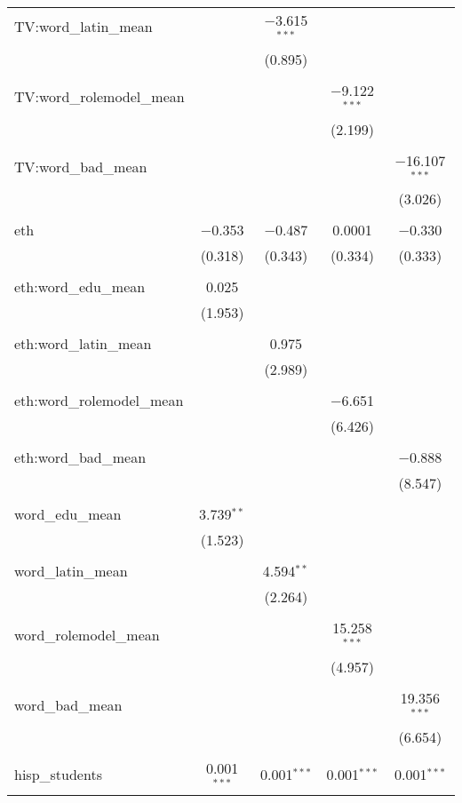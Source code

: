 \begin{table}[!htbp]
\begin{tabular}{@{\extracolsep{-2pt}}lcccc}
 TV:word\_latin\_mean &  & $-$3.615$^{***}$ &  &  \\ 
  &  & (0.895) &  &  \\ 
  & & & & \\ 
 TV:word\_rolemodel\_mean &  &  & $-$9.122$^{***}$ &  \\ 
  &  &  & (2.199) &  \\ 
  & & & & \\ 
 TV:word\_bad\_mean &  &  &  & $-$16.107$^{***}$ \\ 
  &  &  &  & (3.026) \\ 
  & & & & \\ 
 eth & $-$0.353 & $-$0.487 & 0.0001 & $-$0.330 \\ 
  & (0.318) & (0.343) & (0.334) & (0.333) \\ 
  & & & & \\ 
 eth:word\_edu\_mean & 0.025 &  &  &  \\ 
  & (1.953) &  &  &  \\ 
  & & & & \\ 
 eth:word\_latin\_mean &  & 0.975 &  &  \\ 
  &  & (2.989) &  &  \\ 
  & & & & \\ 
 eth:word\_rolemodel\_mean &  &  & $-$6.651 &  \\ 
  &  &  & (6.426) &  \\ 
  & & & & \\ 
 eth:word\_bad\_mean &  &  &  & $-$0.888 \\ 
  &  &  &  & (8.547) \\ 
  & & & & \\ 
 word\_edu\_mean & 3.739$^{**}$ &  &  &  \\ 
  & (1.523) &  &  &  \\ 
  & & & & \\ 
 word\_latin\_mean &  & 4.594$^{**}$ &  &  \\ 
  &  & (2.264) &  &  \\ 
  & & & & \\ 
 word\_rolemodel\_mean &  &  & 15.258$^{***}$ &  \\ 
  &  &  & (4.957) &  \\ 
  & & & & \\ 
 word\_bad\_mean &  &  &  & 19.356$^{***}$ \\ 
  &  &  &  & (6.654) \\ 
  & & & & \\ 
 hisp\_students & 0.001$^{***}$ & 0.001$^{***}$ & 0.001$^{***}$ & 0.001$^{***}$ \\ 

\end{tabular}
\end{table}
